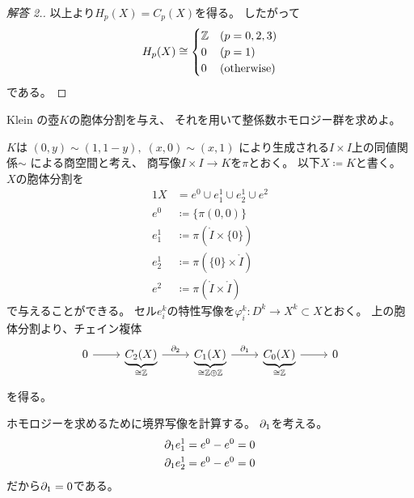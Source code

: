 \documentclass[report]{jlreq}
\begin{document}
\begin{proof}[解答 2.]
    以上より$H_p(X) = C_p(X)$を得る。
    したがって
    \begin{equation}
        H_p(X) \cong \begin{cases}
            \mathbb{Z} & (p = 0, 2, 3) \\
            0 & (p = 1) \\
            0 & (\text{otherwise})
        \end{cases}
    \end{equation}
    である。
\end{proof}

\begin{problem}
    Klein の壺$K$の胞体分割を与え、
    それを用いて整係数ホモロジー群を求めよ。
\end{problem}

\begin{answer}
    $K$は
    $(0, y) \sim (1, 1 - y), \; (x, 0) \sim (x, 1)$
    により生成される$I \times I$上の同値関係$\sim$
    による商空間と考え、
    商写像$I \times I \to K$を$\pi$とおく。
    以下$X \coloneqq K$と書く。
    $X$の胞体分割を
    \begin{alignat}{1}
        X &= e^0 \cup e^1_1 \cup e^1_2 \cup e^2 \\
        e^0 &\coloneqq \{ \pi(0, 0) \} \\
        e^1_1 &\coloneqq \pi(\mathring{I} \times \{ 0 \}) \\
        e^1_2 &\coloneqq \pi(\{ 0 \} \times \mathring{I}) \\
        e^2 &\coloneqq \pi(\mathring{I} \times \mathring{I})
    \end{alignat}
    で与えることができる。
    セル$e^k_i$の特性写像を$\varphi^k_i \colon D^k \to X^k \subset X$とおく。
    上の胞体分割より、チェイン複体
    \begin{equation}
        \begin{tikzcd}
            0
                \ar{r}
                & \underbrace{C_2(X)}_{
                    \cong \Z
                }
                    \ar{r}{\del_2}
                & \underbrace{C_1(X)}_{
                    \cong \Z \oplus \Z
                }
                    \ar{r}{\del_1}
                & \underbrace{C_0(X)}_{
                    \cong \Z
                }
                    \ar{r}
                & 0
        \end{tikzcd}
    \end{equation}
    を得る。

    ホモロジーを求めるために境界写像を計算する。
    $\partial_1$を考える。
    \begin{alignat}{1}
        \partial_1 e^1_1 &= e^0 - e^0 = 0 \\
        \partial_1 e^1_2 &= e^0 - e^0 = 0
    \end{alignat}
    だから$\partial_1 = 0$である。


\end{answer}
\end{document}
